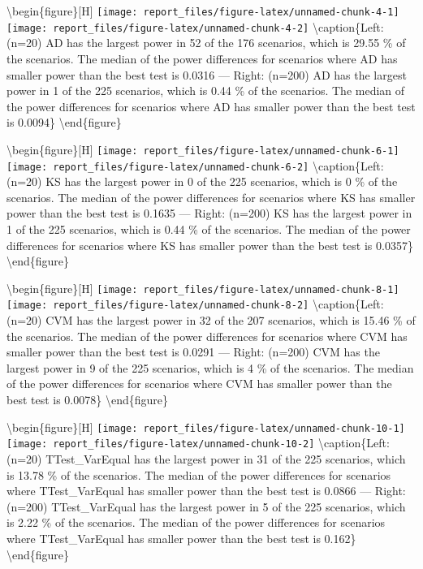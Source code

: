 \documentclass[
]{article}
\begin{document}
\textbackslash begin\{figure\}{[}H{]}
\texttt{[image: report\_files/figure-latex/unnamed-chunk-4-1]}
\texttt{[image: report\_files/figure-latex/unnamed-chunk-4-2]}
\textbackslash caption\{Left:(n=20) AD has the largest power in 52 of
the 176 scenarios, which is 29.55 \% of the scenarios. The median of the
power differences for scenarios where AD has smaller power than the best
test is 0.0316 --- Right: (n=200) AD has the largest power in 1 of the
225 scenarios, which is 0.44 \% of the scenarios. The median of the
power differences for scenarios where AD has smaller power than the best
test is 0.0094\}\label{fig:unnamed-chunk-4} \textbackslash end\{figure\}

\textbackslash begin\{figure\}{[}H{]}
\texttt{[image: report\_files/figure-latex/unnamed-chunk-6-1]}
\texttt{[image: report\_files/figure-latex/unnamed-chunk-6-2]}
\textbackslash caption\{Left:(n=20) KS has the largest power in 0 of the
225 scenarios, which is 0 \% of the scenarios. The median of the power
differences for scenarios where KS has smaller power than the best test
is 0.1635 --- Right: (n=200) KS has the largest power in 1 of the 225
scenarios, which is 0.44 \% of the scenarios. The median of the power
differences for scenarios where KS has smaller power than the best test
is 0.0357\}\label{fig:unnamed-chunk-6} \textbackslash end\{figure\}

\textbackslash begin\{figure\}{[}H{]}
\texttt{[image: report\_files/figure-latex/unnamed-chunk-8-1]}
\texttt{[image: report\_files/figure-latex/unnamed-chunk-8-2]}
\textbackslash caption\{Left:(n=20) CVM has the largest power in 32 of
the 207 scenarios, which is 15.46 \% of the scenarios. The median of the
power differences for scenarios where CVM has smaller power than the
best test is 0.0291 --- Right: (n=200) CVM has the largest power in 9 of
the 225 scenarios, which is 4 \% of the scenarios. The median of the
power differences for scenarios where CVM has smaller power than the
best test is 0.0078\}\label{fig:unnamed-chunk-8}
\textbackslash end\{figure\}

\textbackslash begin\{figure\}{[}H{]}
\texttt{[image: report\_files/figure-latex/unnamed-chunk-10-1]}
\texttt{[image: report\_files/figure-latex/unnamed-chunk-10-2]}
\textbackslash caption\{Left:(n=20) TTest\_VarEqual has the largest
power in 31 of the 225 scenarios, which is 13.78 \% of the scenarios.
The median of the power differences for scenarios where TTest\_VarEqual
has smaller power than the best test is 0.0866 --- Right: (n=200)
TTest\_VarEqual has the largest power in 5 of the 225 scenarios, which
is 2.22 \% of the scenarios. The median of the power differences for
scenarios where TTest\_VarEqual has smaller power than the best test is
0.162\}\label{fig:unnamed-chunk-10} \textbackslash end\{figure\}
\end{document}
